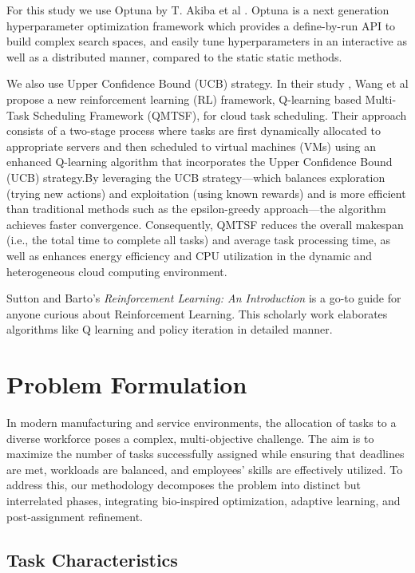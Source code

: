 \documentclass[%
aip,
cp,  %
reprint
]{revtex4-2}
\begin{document}
	For this study we use Optuna by T. Akiba et al \cite{Akiba2019Optuna}. Optuna is a next generation hyperparameter optimization framework which provides a define-by-run API to build complex search spaces, and easily tune hyperparameters in an interactive as well as a distributed manner, compared to the static static methods.
	
	We also use Upper Confidence Bound (UCB) strategy. In their study \cite{Wang2023TaskScheduling}, Wang et al propose a new reinforcement learning (RL) framework, Q-learning based Multi-Task Scheduling Framework (QMTSF), for cloud task scheduling. Their approach consists of a two-stage process where tasks are first dynamically allocated to appropriate servers and then scheduled to virtual machines (VMs) using an enhanced Q-learning algorithm that incorporates the Upper Confidence Bound (UCB) strategy.By leveraging the UCB strategy—which balances exploration (trying new actions) and exploitation (using known rewards) and is more efficient than traditional methods such as the epsilon-greedy approach—the algorithm achieves faster convergence. Consequently, QMTSF reduces the overall makespan (i.e., the total time to complete all tasks) and average task processing time, as well as enhances energy efficiency and CPU utilization in the dynamic and heterogeneous cloud computing environment.
	
	Sutton and Barto’s \textit{Reinforcement Learning: An Introduction}\cite{SuttonBarto1998} is a go-to guide for anyone curious about Reinforcement Learning. This scholarly work elaborates algorithms like Q learning and policy iteration in detailed manner.
	
	
	\section{\label{sec:problem}Problem Formulation}
	
	In modern manufacturing and service environments, the allocation of tasks to a
	diverse workforce poses a complex, multi-objective challenge. The aim is to
	maximize the number of tasks successfully assigned while ensuring that
	deadlines are met, workloads are balanced, and employees' skills are
	effectively utilized. To address this, our methodology decomposes the problem
	into distinct but interrelated phases, integrating bio-inspired optimization,
	adaptive learning, and post-assignment refinement.
	
	\subsection{\label{subsec:task}Task Characteristics}
	
\end{document}
